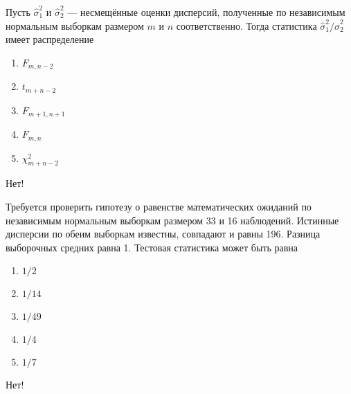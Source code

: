 \documentclass[t]{beamer}
\begin{document}
 \begin{frame} \label{8-No} 
\begin{block}{8} 

  Пусть $\hat\sigma^2_1$ и  $\hat\sigma^2_2$ — несмещённые оценки дисперсий, полученные по независимым нормальным выборкам размером $m$ и $n$ соответственно. Тогда статистика $\hat\sigma^2_1/\hat\sigma^2_2$ имеет распределение


 \end{block} 
\begin{enumerate} 
\item[] \hyperlink{8-No}{\beamergotobutton{} $F_{m,n-2}$}
\item[] \hyperlink{8-No}{\beamergotobutton{} $t_{m+n-2}$}
\item[] \hyperlink{8-No}{\beamergotobutton{} $F_{m+1, n+1}$}
\item[] \hyperlink{8-No}{\beamergotobutton{} $F_{m,n}$}
\item[] \hyperlink{8-No}{\beamergotobutton{} $\chi^2_{m+n-2}$}
\end{enumerate} 

 \alert{Нет!}
  \hyperlink{9}{}
 
\end{frame} 


 \begin{frame} \label{9-No} 
\begin{block}{9} 

  Требуется проверить гипотезу о равенстве математических ожиданий по независимым нормальным выборкам размером 33 и 16 наблюдений. Истинные дисперсии по обеим выборкам известны, совпадают и равны 196. Разница выборочных средних равна 1. Тестовая статистика может быть равна


 \end{block} 
\begin{enumerate} 
\item[] \hyperlink{9-No}{\beamergotobutton{} $1/2$}
\item[] \hyperlink{9-No}{\beamergotobutton{} $1/14$}
\item[] \hyperlink{9-No}{\beamergotobutton{} $1/49$}
\item[] \hyperlink{9-Yes}{\beamergotobutton{} $1/4$}
\item[] \hyperlink{9-No}{\beamergotobutton{} $1/7$}
\end{enumerate} 

 \alert{Нет!} 
\end{frame} 
\end{document}
